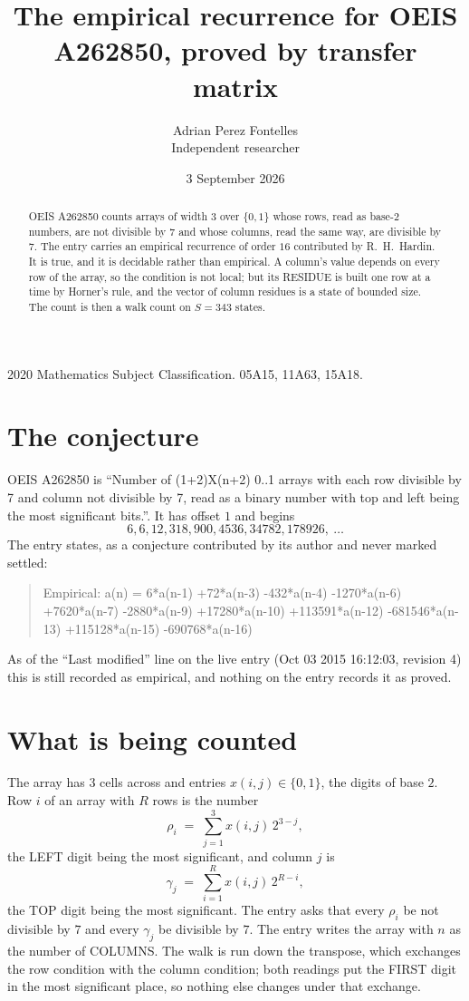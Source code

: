 \documentclass[11pt,a4paper]{article}
\title{The empirical recurrence for OEIS A262850, proved by transfer matrix}
\author{Adrian Perez Fontelles\\ \small Independent researcher}
\date{3 September 2026}
\theoremstyle{plain}
\theoremstyle{definition}
\begin{document}
\maketitle

\begin{abstract}
OEIS A262850 counts arrays of width $3$ over $\{0,1\}$ whose rows, read as base-$2$
numbers, are not divisible by $7$ and whose columns, read the same way, are divisible by
$7$. The entry carries an empirical recurrence of order $16$ contributed by
R.~H.~Hardin. It is true, and it is decidable rather than empirical. A column's value depends on
every row of the array, so the condition is not local; but its RESIDUE is built one row at a
time by Horner's rule, and the vector of column residues is a state of bounded size. The count
is then a walk count on $S=343$ states.
\end{abstract}

\noindent\small 2020 Mathematics Subject Classification. 05A15, 11A63, 15A18.\normalsize

\section{The conjecture}

OEIS A262850 is ``Number of (1+2)X(n+2) 0..1 arrays with each row divisible by 7 and column not divisible by 7, read as a binary number with top and left being the most significant bits.''. It has offset $1$ and begins
\[
6, 6, 12, 318, 900, 4536, 34782, 178926,\ \dots
\]
The entry states, as a conjecture contributed by its author and never marked settled:
\begin{quote}
Empirical: a(n) = 6*a(n-1) +72*a(n-3) -432*a(n-4) -1270*a(n-6) +7620*a(n-7) -2880*a(n-9) +17280*a(n-10) +113591*a(n-12) -681546*a(n-13) +115128*a(n-15) -690768*a(n-16)
\end{quote}
As of the ``Last modified'' line on the live entry (Oct 03 2015 16:12:03, revision 4) this is still
recorded as empirical, and nothing on the entry records it as proved.

\section{What is being counted}

The array has $3$ cells across and entries $x(i,j)\in\{0,1\}$, the digits of
base $2$. Row $i$ of an array with $R$ rows is the number
\[
\rho_i\;=\;\sum_{j=1}^{3}x(i,j)\,2^{3-j} ,
\]
the LEFT digit being the most significant, and column $j$ is
\[
\gamma_j\;=\;\sum_{i=1}^{R}x(i,j)\,2^{R-i} ,
\]
the TOP digit being the most significant. The entry asks that every $\rho_i$ be not divisible by
$7$ and every $\gamma_j$ be divisible by $7$. The entry writes the array with $n$ as the number of COLUMNS. The walk is run down the transpose, which exchanges the row condition with the column condition; both readings put the FIRST digit in the most significant place, so nothing else changes under that exchange.
\end{document}
